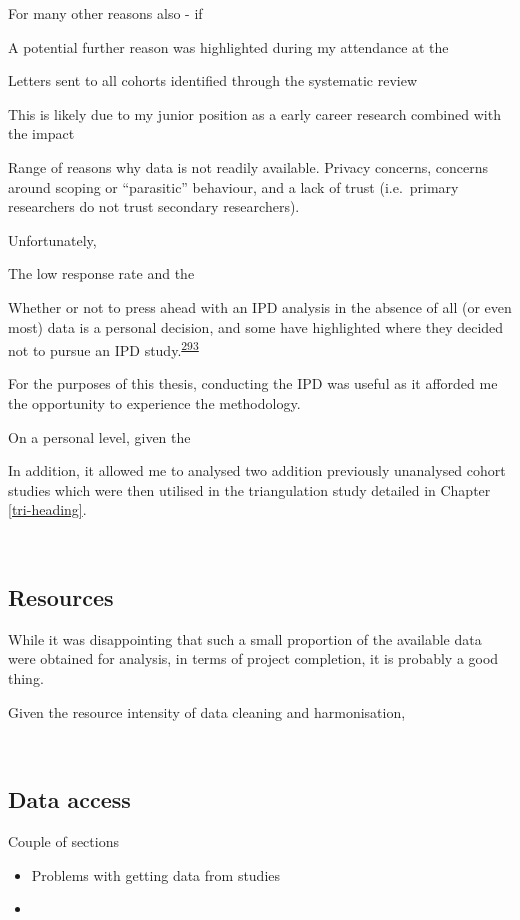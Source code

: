 \documentclass[a4paper, twoside]{templates/ociamthesis}
\providecommand{\tightlist}{%
  \setlength{\itemsep}{0pt}\setlength{\parskip}{0pt}}
\begin{document}
For many other reasons also - if

A potential further reason was highlighted during my attendance at the

Letters sent to all cohorts identified through the systematic review

This is likely due to my junior position as a early career research combined with the impact

Range of reasons why data is not readily available. Privacy concerns, concerns around scoping or ``parasitic'' behaviour, and a lack of trust (i.e.~primary researchers do not trust secondary researchers).

Unfortunately,

The low response rate and the

Whether or not to press ahead with an IPD analysis in the absence of all (or even most) data is a personal decision, and some have highlighted where they decided not to pursue an IPD study.\textsuperscript{\protect\hyperlink{ref-jaspers2014}{293}}

For the purposes of this thesis, conducting the IPD was useful as it afforded me the opportunity to experience the methodology.

On a personal level, given the

In addition, it allowed me to analysed two addition previously unanalysed cohort studies which were then utilised in the triangulation study detailed in Chapter \ref{tri-heading}.

~

\hypertarget{resources}{%
\subsection{Resources}\label{resources}}

While it was disappointing that such a small proportion of the available data were obtained for analysis, in terms of project completion, it is probably a good thing.

Given the resource intensity of data cleaning and harmonisation,

~

\hypertarget{data-access-1}{%
\subsection{Data access}\label{data-access-1}}

Couple of sections

\begin{itemize}
\tightlist
\item
  Problems with getting data from studies
\item
\end{itemize}
\end{document}
